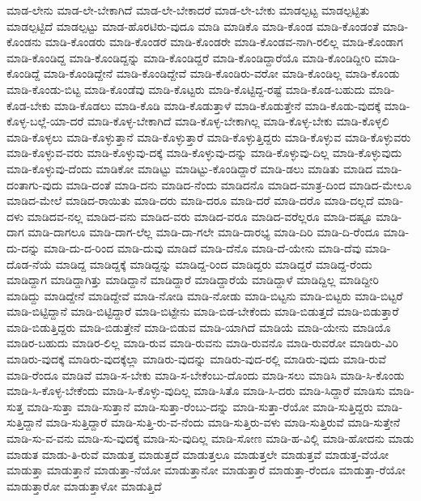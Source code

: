 {ಮಾಡ-ಲೇನು
ಮಾಡ-ಲೇ-ಬೇಕಾಗಿದೆ
ಮಾಡ-ಲೇ-ಬೇಕಾದರೆ
ಮಾಡ-ಲೇ-ಬೇಕು
ಮಾಡಲ್ಪಟ್ಟ
ಮಾಡಲ್ಪಟ್ಟಿತು
ಮಾಡಲ್ಪಟ್ಟಿದೆ
ಮಾಡಲ್ಪಟ್ಟು
ಮಾಡ-ಹೊರಟಿರು-ವುದೂ
ಮಾಡಿ
ಮಾಡಿಕೊ
ಮಾಡಿ-ಕೊಂಡ
ಮಾಡಿ-ಕೊಂಡಂತೆ
ಮಾಡಿ-ಕೊಂಡನು
ಮಾಡಿ-ಕೊಂಡರು
ಮಾಡಿ-ಕೊಂಡರೆ
ಮಾಡಿ-ಕೊಂಡರೇ
ಮಾಡಿ-ಕೊಂಡವ-ನಾಗಿ-ರಲಿಲ್ಲ
ಮಾಡಿ-ಕೊಂಡಾಗ
ಮಾಡಿ-ಕೊಂಡಿದ್ದ
ಮಾಡಿ-ಕೊಂಡಿದ್ದನ್ನು
ಮಾಡಿ-ಕೊಂಡಿದ್ದರೆ
ಮಾಡಿ-ಕೊಂಡಿದ್ದಾರೆಯೊ
ಮಾಡಿ-ಕೊಂಡಿದ್ದೀರಿ
ಮಾಡಿ-ಕೊಂಡಿದ್ದೆ
ಮಾಡಿ-ಕೊಂಡಿದ್ದೇನೆ
ಮಾಡಿ-ಕೊಂಡಿದ್ದೇವೆ
ಮಾಡಿ-ಕೊಂಡಿರು-ವರೋ
ಮಾಡಿ-ಕೊಂಡಿಲ್ಲ
ಮಾಡಿ-ಕೊಂಡು
ಮಾಡಿ-ಕೊಂಡು-ಬಿಟ್ಟ
ಮಾಡಿ-ಕೊಂಡೆವು
ಮಾಡಿ-ಕೊಟ್ಟರು
ಮಾಡಿ-ಕೊಟ್ಟಿದ್ದ-ರಷ್ಟೆ
ಮಾಡಿ-ಕೊಡ-ಬಹುದು
ಮಾಡಿ-ಕೊಡ-ಬೇಕು
ಮಾಡಿ-ಕೊಡಲು
ಮಾಡಿ-ಕೊಡಿ
ಮಾಡಿ-ಕೊಡುತ್ತಾಳೆ
ಮಾಡಿ-ಕೊಡುತ್ತೇನೆ
ಮಾಡಿ-ಕೊಡು-ವುದಕ್ಕೆ
ಮಾಡಿ-ಕೊಳ್ಳ-ಬಲ್ಲೆ-ಯಾ-ದರೆ
ಮಾಡಿ-ಕೊಳ್ಳ-ಬೇಕಾಗಿದೆ
ಮಾಡಿ-ಕೊಳ್ಳ-ಬೇಕಾಗಿಲ್ಲ
ಮಾಡಿ-ಕೊಳ್ಳ-ಬೇಕು
ಮಾಡಿ-ಕೊಳ್ಳಲಿ
ಮಾಡಿ-ಕೊಳ್ಳಲು
ಮಾಡಿ-ಕೊಳ್ಳುತ್ತಾನೆ
ಮಾಡಿ-ಕೊಳ್ಳುತ್ತಾರೆ
ಮಾಡಿ-ಕೊಳ್ಳುತ್ತಿದ್ದರು
ಮಾಡಿ-ಕೊಳ್ಳುವ
ಮಾಡಿ-ಕೊಳ್ಳುವರು
ಮಾಡಿ-ಕೊಳ್ಳುವ-ವರು
ಮಾಡಿ-ಕೊಳ್ಳುವು-ದಕ್ಕೆ
ಮಾಡಿ-ಕೊಳ್ಳುವು-ದನ್ನು
ಮಾಡಿ-ಕೊಳ್ಳುವು-ದಿಲ್ಲ
ಮಾಡಿ-ಕೊಳ್ಳುವುದು
ಮಾಡಿ-ಕೊಳ್ಳುವು-ದೆಂದು
ಮಾಡಿಕೋ
ಮಾಡಿಟ್ಟು
ಮಾಡಿಟ್ಟು-ಕೊಂಡಿದ್ದಾರೆ
ಮಾಡಿ-ಡಲು
ಮಾಡಿತು
ಮಾಡಿದ
ಮಾಡಿ-ದಂತಾಗು-ವುದು
ಮಾಡಿ-ದಂತೆ
ಮಾಡಿ-ದನು
ಮಾಡಿದ-ನೆಂದು
ಮಾಡಿದನೊ
ಮಾಡಿದ-ಮಾತ್ರ-ದಿಂದ
ಮಾಡಿದ-ಮೇಲೂ
ಮಾಡಿದ-ಮೇಲೆ
ಮಾಡಿದ-ರಾಯಿತು
ಮಾಡಿ-ದರು
ಮಾಡಿ-ದರೂ
ಮಾಡಿ-ದರೆ
ಮಾಡಿ-ದರೊ
ಮಾಡಿ-ದಲ್ಲದೆ
ಮಾಡಿ-ದಳು
ಮಾಡಿದವ-ನಲ್ಲ
ಮಾಡಿದ-ವನು
ಮಾಡಿದ-ವರು
ಮಾಡಿದ-ವರೂ
ಮಾಡಿದ-ವರೆಲ್ಲರೂ
ಮಾಡಿ-ದಷ್ಟೂ
ಮಾಡಿ-ದಾಗ
ಮಾಡಿ-ದಾಗಲೂ
ಮಾಡಿ-ದಾಗ-ಲೆಲ್ಲ
ಮಾಡಿ-ದಾ-ಗಲೇ
ಮಾಡಿ-ದಾರಭ್ಯ
ಮಾಡಿ-ದಿರಿ
ಮಾಡಿ-ದಿ-ರೆಂದೂ
ಮಾಡಿ-ದು-ದನ್ನು
ಮಾಡಿ-ದು-ದ-ರಿಂದ
ಮಾಡಿ-ದುವು
ಮಾಡಿದೆ
ಮಾಡಿ-ದೆನೊ
ಮಾಡಿ-ದೆ-ಯೇನು
ಮಾಡಿ-ದೆವು
ಮಾಡಿ-ದೊಡ-ನೆಯೆ
ಮಾಡಿದ್ದ
ಮಾಡಿದ್ದಕ್ಕೆ
ಮಾಡಿದ್ದನ್ನು
ಮಾಡಿದ್ದ-ರಿಂದ
ಮಾಡಿದ್ದರು
ಮಾಡಿದ್ದರೆ
ಮಾಡಿದ್ದ-ರೆಂದು
ಮಾಡಿದ್ದಾಗ
ಮಾಡಿದ್ದಾಗಿತ್ತು
ಮಾಡಿದ್ದಾನೆ
ಮಾಡಿದ್ದಾರೆ
ಮಾಡಿದ್ದಾರೆಯೆ
ಮಾಡಿದ್ದಾಳೆ
ಮಾಡಿದ್ದಿಲ್ಲ
ಮಾಡಿದ್ದೀರಿ
ಮಾಡಿದ್ದು
ಮಾಡಿದ್ದೇನೆ
ಮಾಡಿದ್ದೇವೆ
ಮಾಡಿ-ನೋಡಿ
ಮಾಡಿ-ನೋಡು
ಮಾಡಿ-ಬಿಟ್ಟನು
ಮಾಡಿ-ಬಿಟ್ಟರು
ಮಾಡಿ-ಬಿಟ್ಟರೆ
ಮಾಡಿ-ಬಿಟ್ಟಿದ್ದಾನೆ
ಮಾಡಿ-ಬಿಟ್ಟಿದ್ದಾರೆ
ಮಾಡಿ-ಬಿಟ್ಟೇನು
ಮಾಡಿ-ಬಿಡ-ಬೇಕೆಂದು
ಮಾಡಿ-ಬಿಡುತ್ತದೆ
ಮಾಡಿ-ಬಿಡುತ್ತಾರೆ
ಮಾಡಿ-ಬಿಡುತ್ತಿದ್ದರು
ಮಾಡಿ-ಬಿಡುತ್ತೇನೆ
ಮಾಡಿ-ಬಿಡುವ
ಮಾಡಿ-ಯಾಗಿದೆ
ಮಾಡಿಯೆ
ಮಾಡಿ-ಯೇನು
ಮಾಡಿಯೊ
ಮಾಡಿರ-ಬಹುದು
ಮಾಡಿರ-ಲಿಲ್ಲ
ಮಾಡಿ-ರುವ
ಮಾಡಿ-ರುವನು
ಮಾಡಿ-ರುವನೊ
ಮಾಡಿ-ರುವರೋ
ಮಾಡಿರು-ವಿರಿ
ಮಾಡಿರು-ವುದಕ್ಕೆ
ಮಾಡಿರು-ವುದಕ್ಕೆಲ್ಲಾ
ಮಾಡಿರು-ವುದನ್ನು
ಮಾಡಿರು-ವುದ-ರಲ್ಲಿ
ಮಾಡಿರು-ವುದು
ಮಾಡಿ-ರುವೆ
ಮಾಡಿ-ರೆಂದೂ
ಮಾಡಿವೆ
ಮಾಡಿ-ಸ-ಬೇಕು
ಮಾಡಿ-ಸ-ಬೇಕೆಂಬು-ದೊಂದು
ಮಾಡಿ-ಸಲು
ಮಾಡಿಸಿ
ಮಾಡಿ-ಸಿ-ಕೊಂಡು
ಮಾಡಿ-ಸಿ-ಕೊಳ್ಳ-ಬೇಕೆಂದು
ಮಾಡಿ-ಸಿ-ಕೊಳ್ಳು-ವುದಿಲ್ಲ
ಮಾಡಿ-ಸಿತೊ
ಮಾಡಿ-ಸಿ-ದರು
ಮಾಡಿ-ಸಿದ್ದಾರೆ
ಮಾಡಿಸು
ಮಾಡಿ-ಸುತ್ತ
ಮಾಡಿ-ಸುತ್ತಾ
ಮಾಡಿ-ಸುತ್ತಾನೆ
ಮಾಡಿ-ಸುತ್ತಾ-ರೆಂಬು-ದನ್ನು
ಮಾಡಿ-ಸುತ್ತಾ-ರೆಯೋ
ಮಾಡಿ-ಸುತ್ತಿದ್ದರು
ಮಾಡಿ-ಸುತ್ತಿದ್ದಾನೆ
ಮಾಡಿ-ಸುತ್ತಿದ್ದಾರೆ
ಮಾಡಿ-ಸುತ್ತಿ-ರು-ವ-ನೆಂದು
ಮಾಡಿ-ಸುತ್ತಿರು-ವಳು
ಮಾಡಿ-ಸುತ್ತಿರುವೆ
ಮಾಡಿ-ಸುತ್ತೇನೆ
ಮಾಡಿ-ಸು-ವ-ವನು
ಮಾಡಿ-ಸು-ವುದಕ್ಕೆ
ಮಾಡಿ-ಸು-ವುದಿಲ್ಲ
ಮಾಡಿ-ಸೋಣ
ಮಾಡಿ-ಹ-ವಿಲ್ಲಿ
ಮಾಡಿ-ಹೋದನು
ಮಾಡು
ಮಾಡುತ
ಮಾಡು-ತಿ-ರುವೆ
ಮಾಡುತ್ತ
ಮಾಡುತ್ತದೆ
ಮಾಡುತ್ತಲೂ
ಮಾಡುತ್ತಲೇ
ಮಾಡುತ್ತವೆ
ಮಾಡುತ್ತ-ವೆಯೋ
ಮಾಡುತ್ತಾ
ಮಾಡುತ್ತಾನೆ
ಮಾಡುತ್ತಾ-ನೆಯೋ
ಮಾಡುತ್ತಾನೋ
ಮಾಡುತ್ತಾರೆ
ಮಾಡುತ್ತಾ-ರೆಂದೂ
ಮಾಡುತ್ತಾ-ರೆಯೋ
ಮಾಡುತ್ತಾರೋ
ಮಾಡುತ್ತಾಳೋ
ಮಾಡುತ್ತಿದೆ
}
